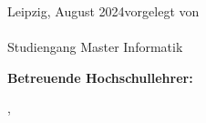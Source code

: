 \begin{titlepage}
\begin{center}
		\renewcommand{\arraystretch}{1}
  \end{center}
  
Leipzig, August 2024\hfill vorgelegt von \\[3mm]
\hspace*{\fill} {\large \myfirstname~\mylastname}\\
\hspace*{\fill} Studiengang Master Informatik

\vspace{1cm}

{\large\textbf{Betreuende Hochschullehrer:}}
%
%
%


\quad \myuni, \myworkinggroup
  \makeatother
\end{titlepage}

\newpage
\null
\thispagestyle{empty}
\newpage
